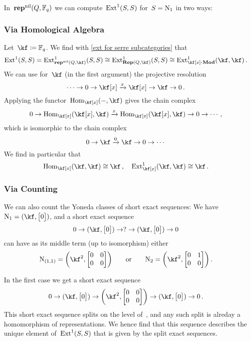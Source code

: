 \documentclass[a4paper, 11pt, twoside=semi]{scrartcl}
\begin{document}
In~$\mathbf{rep}^{\mathrm{nil}}(Q, \mathbb{F}_q)$ we can compute~$\operatorname{Ext}^1(S,S)$ for~$S = \mathrm{N}_1$ in two ways:

\subsubsection{Via Homological Algebra}

Let~$\kf \defined \Finite_q$.
We find with \cref{ext for serre subcategories} that
\[
  \Ext^1(S,S)
  =
  \Ext^1_{\repnil(Q, \kf)}(S,S)
  \cong
  \Ext^1_{\Rep(Q, \kf)}(S, S)
  \cong
  \Ext^1_{\Mod{\kf[x]}}( \kf, \kf ) \,.
\]
We can use for~$\kf$ (in the first argument) the projective resolution
\[
  \dotsb
  \to
  0
  \to
  \kf[x]
  \xto{x}
  \kf[x]
  \to
  \kf
  \to
  0 \,.
\]
Applying the functor~$\Hom_{\kf[x]}(-, \kf)$ gives the chain complex
\[
  0
  \to
  \Hom_{\kf[x]}( \kf[x], \kf )
  \xto{x}
  \Hom_{\kf[x]}( \kf[x], \kf )
  \to
  0
  \to
  \dotsb \,,
\]
which is isomorphic to the chain complex
\[
  0
  \to
  \kf
  \xto{0}
  \kf
  \to
  0
  \to
  \dotsb
\]
We find in particular that
\[
  \Hom_{\kf[x]}(\kf, \kf) \cong \kf \,,
  \quad
  \Ext^1_{\kf[x]}(\kf, \kf) \cong \kf \,.
\]

\subsubsection{Via Counting}

We can also count the Yoneda classes of short exact sequences:
We have~$\Nil_1 = (\kf, \begin{bmatrix} 0 \end{bmatrix})$, and a short exact sequence
\[
  0
  \to
  (\kf, \begin{bmatrix} 0 \end{bmatrix})
  \to
  ?
  \to
  (\kf, \begin{bmatrix} 0 \end{bmatrix})
  \to
  0
\]
can have as its middle term (up to isomorphism) either
\[
  \Nil_{(1,1)}
  =
  \biggl( \kf^2, \begin{bmatrix} 0 & 0 \\ 0 & 0 \end{bmatrix} \biggr)
  \qquad\text{or}\qquad
  \Nil_2
  =
  \biggl( \kf^2, \begin{bmatrix} 0 & 1 \\ 0 & 0 \end{bmatrix} \biggr) \,.
\]

In the first case we get a short exact sequence
\[
  0
  \to
  (\kf, \begin{bmatrix} 0 \end{bmatrix})
  \to
  \biggl( \kf^2, \begin{bmatrix} 0 & 0 \\ 0 & 0 \end{bmatrix} \biggr)
  \to
  (\kf, \begin{bmatrix} 0 \end{bmatrix})
  \to
  0 \,.
\]
This short exact sequence splits on the level of~\vectorspaces{$\kf$}, and any such split is alreday a homomorphism of representations.
We hence find that this sequence describes the unique element of~$\operatorname{Ext}^1(S,S)$ that is given by the split exact sequences.
\end{document}
